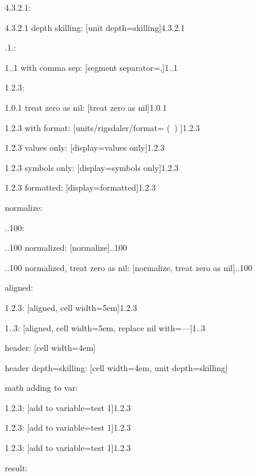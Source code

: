 \documentclass{article}
\begin{document}
4.3.2.1: \hfill {}

4.3.2.1 depth skilling: \hfill {}[unit depth=skilling]{4.3.2.1}

.1.: \hfill {}

1..1 with comma sep: \hfill {}[segment separator={,}]{1..1}

1.2.3: \hfill {}

1.0.1 treat zero as nil: \hfill {}[treat zero as nil]{1.0.1}

1.2.3 with format: \hfill {}[units/rigsdaler/format={ (\SYMBOL\ \VALUE) }]{1.2.3}

1.2.3 values only: \hfill {}[display=values only]{1.2.3}

1.2.3 symbols only: \hfill {}[display=symbols only]{1.2.3}

1.2.3 formatted: \hfill {}[display=formatted]{1.2.3}

normalize:

..100: \hfill {}

..100 normalized: \hfill {}[normalize]{..100}

..100 normalized, treat zero as nil: \hfill {}[normalize, treat zero as nil]{..100}

aligned:

1.2.3: \hfill {}[aligned, cell width=5em]{1.2.3}

1..3: \hfill {}[aligned, cell width=5em, replace nil with={---}]{1..3}

header: \hfill {}[cell width=4em]

header depth=skilling: \hfill {}[cell width=4em, unit depth=skilling]

math adding to var:

1.2.3: \hfill {}[add to variable=test 1]{1.2.3}

1.2.3: \hfill {}[add to variable=test 1]{1.2.3}

1.2.3: \hfill {}[add to variable=test 1]{1.2.3}

result: \hfill {}
\end{document}
